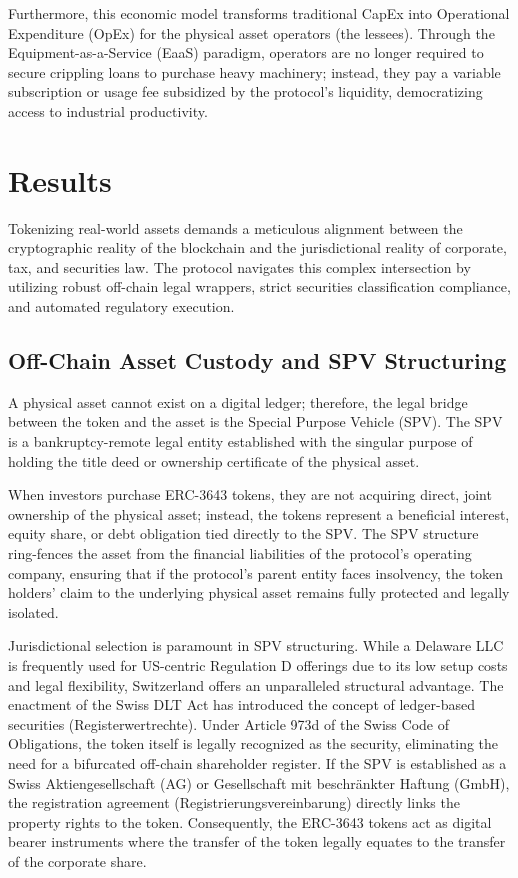 \documentclass{Resources/bdlt-project}
\begin{document}
Furthermore, this economic model transforms traditional CapEx into Operational Expenditure (OpEx) for the physical asset operators (the lessees). Through the Equipment-as-a-Service (EaaS) paradigm, operators are no longer required to secure crippling loans to purchase heavy machinery; instead, they pay a variable subscription or usage fee subsidized by the protocol's liquidity, democratizing access to industrial productivity.

\section{Results}
Tokenizing real-world assets demands a meticulous alignment between the cryptographic reality of the blockchain and the jurisdictional reality of corporate, tax, and securities law. The protocol navigates this complex intersection by utilizing robust off-chain legal wrappers, strict securities classification compliance, and automated regulatory execution.

\subsection{Off-Chain Asset Custody and SPV Structuring}
A physical asset cannot exist on a digital ledger; therefore, the legal bridge between the token and the asset is the Special Purpose Vehicle (SPV). The SPV is a bankruptcy-remote legal entity established with the singular purpose of holding the title deed or ownership certificate of the physical asset.

When investors purchase ERC-3643 tokens, they are not acquiring direct, joint ownership of the physical asset; instead, the tokens represent a beneficial interest, equity share, or debt obligation tied directly to the SPV. The SPV structure ring-fences the asset from the financial liabilities of the protocol's operating company, ensuring that if the protocol's parent entity faces insolvency, the token holders' claim to the underlying physical asset remains fully protected and legally isolated.

Jurisdictional selection is paramount in SPV structuring. While a Delaware LLC is frequently used for US-centric Regulation D offerings due to its low setup costs and legal flexibility, Switzerland offers an unparalleled structural advantage. The enactment of the Swiss DLT Act has introduced the concept of ledger-based securities (Registerwertrechte). Under Article 973d of the Swiss Code of Obligations, the token itself is legally recognized as the security, eliminating the need for a bifurcated off-chain shareholder register. If the SPV is established as a Swiss Aktiengesellschaft (AG) or Gesellschaft mit beschränkter Haftung (GmbH), the registration agreement (Registrierungsvereinbarung) directly links the property rights to the token. Consequently, the ERC-3643 tokens act as digital bearer instruments where the transfer of the token legally equates to the transfer of the corporate share.
\end{document}
